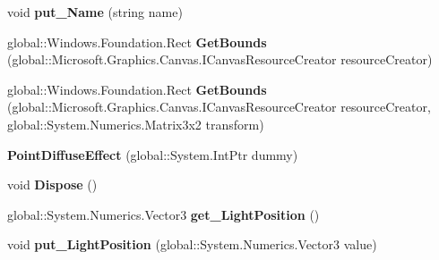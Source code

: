 \begin{DoxyCompactItemize}
void {\bfseries put\+\_\+\+Name} (string name)
\item 
\mbox{\label{class_microsoft_1_1_graphics_1_1_canvas_1_1_effects_1_1_point_diffuse_effect_a4ea41fe2e96af16d284ce3c8fed52889}} 
global\+::\+Windows.\+Foundation.\+Rect {\bfseries Get\+Bounds} (global\+::\+Microsoft.\+Graphics.\+Canvas.\+I\+Canvas\+Resource\+Creator resource\+Creator)
\item 
\mbox{\label{class_microsoft_1_1_graphics_1_1_canvas_1_1_effects_1_1_point_diffuse_effect_a7e675ad720b1c7fd2661be4a4e964855}} 
global\+::\+Windows.\+Foundation.\+Rect {\bfseries Get\+Bounds} (global\+::\+Microsoft.\+Graphics.\+Canvas.\+I\+Canvas\+Resource\+Creator resource\+Creator, global\+::\+System.\+Numerics.\+Matrix3x2 transform)
\item 
\mbox{\label{class_microsoft_1_1_graphics_1_1_canvas_1_1_effects_1_1_point_diffuse_effect_a339b570af9f36502e7a354c01bdefc1a}} 
{\bfseries Point\+Diffuse\+Effect} (global\+::\+System.\+Int\+Ptr dummy)
\item 
\mbox{\label{class_microsoft_1_1_graphics_1_1_canvas_1_1_effects_1_1_point_diffuse_effect_aab9fe4ed8a06cb7b338c2b768c889cc4}} 
void {\bfseries Dispose} ()
\item 
\mbox{\label{class_microsoft_1_1_graphics_1_1_canvas_1_1_effects_1_1_point_diffuse_effect_adc8bd7af80c3dba7ae3387489695b283}} 
global\+::\+System.\+Numerics.\+Vector3 {\bfseries get\+\_\+\+Light\+Position} ()
\item 
\mbox{\label{class_microsoft_1_1_graphics_1_1_canvas_1_1_effects_1_1_point_diffuse_effect_ac426fad2476e24dd0029d5df1a2d6f1c}} 
void {\bfseries put\+\_\+\+Light\+Position} (global\+::\+System.\+Numerics.\+Vector3 value)
\item 
\mbox{\label{class_microsoft_1_1_graphics_1_1_canvas_1_1_effects_1_1_point_diffuse_effect_aebeb09f011a975a725b9ccef39d2f898}} 

\end{DoxyCompactItemize}
